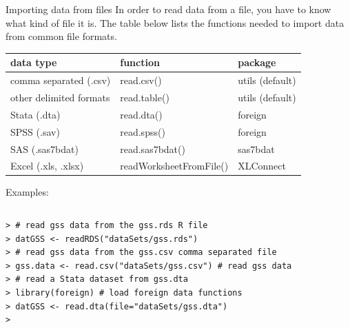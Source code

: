 \documentclass[table,smaller]{beamer}
\begin{document}
\begin{frame}[fragile,label=sec-4-3]{Importing data from files}
 In order to read data from a file, you have to know what kind of file it is. The table below lists the functions needed to import data from common file formats.

\begin{center}
\begin{tabular}{lll}
data type & function & package\\
\hline
comma separated (.csv) & read.csv() & utils (default)\\
other delimited formats & read.table() & utils (default)\\
Stata (.dta) & read.dta() & foreign\\
SPSS (.sav) & read.spss() & foreign\\
SAS (.sas7bdat) & read.sas7bdat() & sas7bdat\\
Excel (.xls, .xlsx) & readWorksheetFromFile() & XLConnect\\
\hline
\end{tabular}
\end{center}

Examples:
\vspace{-.5em}
\begin{columns}
\begin{block}{}
\begin{verbatim}
> # read gss data from the gss.rds R file
> datGSS <- readRDS("dataSets/gss.rds")
> # read gss data from the gss.csv comma separated file
> gss.data <- read.csv("dataSets/gss.csv") # read gss data
> # read a Stata dataset from gss.dta 
> library(foreign) # load foreign data functions
> datGSS <- read.dta(file="dataSets/gss.dta")
>
\end{verbatim}
\end{block}
\end{columns}
\vspace{.5em}
\end{frame}
\end{document}
